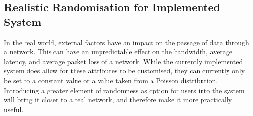 \subsection{Realistic Randomisation for Implemented System}
In the real world, external factors have an impact on the passage of data through a network. This can have an unpredictable effect on the bandwidth, average latency, and average packet loss of a network. While the currently implemented system does allow for these attributes to be customised, they can currently only be set to a constant value or a value taken from a Poisson distribution. Introducing a greater element of randomness as option for users into the system will bring it closer to a real network, and therefore make it more practically useful.
